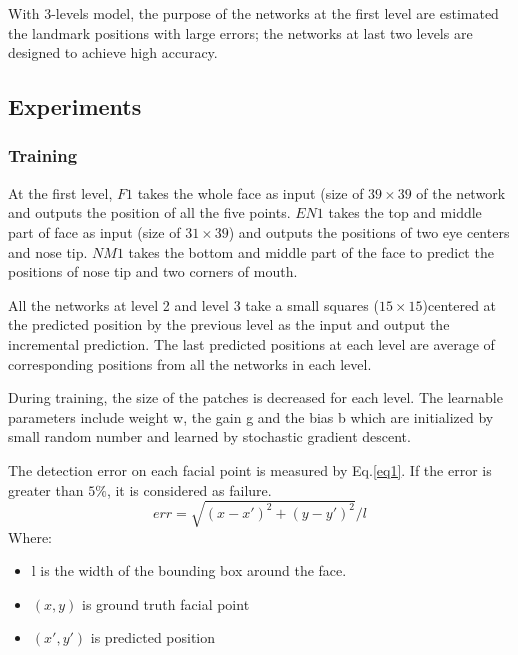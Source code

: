 \documentclass[12pt,a4paper]{article}
\begin{document}
 With 3-levels model, the purpose of the networks at the first level are estimated the landmark positions with large errors; the networks at last two levels are designed to achieve high accuracy.
\subsection{Experiments}
\subsubsection{Training}
At the first level, $F1$ takes the whole face as input (size of $39 \times 39$ of the network and outputs the position of all the five points. $EN1$ takes the top and middle part of face as input (size of $31 \times 39$) and outputs the positions of two eye centers and nose tip. $NM1$ takes the bottom and middle part of the face to predict the positions of nose tip and two corners of mouth.

All the networks at level 2 and level 3 take a small squares ($15 \times 15$)centered at the predicted position by the previous level as the input and output the incremental prediction. The last predicted positions at each level are average of corresponding positions from all the networks in each level. 

During training, the size of the patches is decreased for each level. The learnable parameters include weight w, the gain g and the bias b which are initialized by small random number and learned by stochastic gradient descent.

The detection error on each facial point is measured by Eq.\ref{eq1}. If the error is greater than $5\%$, it is considered as failure.
\begin{equation}
	err = \sqrt{(x-x')^2 + (y-y')^2}/l
	\label{eq1}
\end{equation}
Where:
\begin{itemize}
	\item l is the width of the bounding box around the face.
	\item $(x,y)$ is ground truth facial point
	\item $(x',y')$ is predicted position
\end{itemize}
\end{document}
